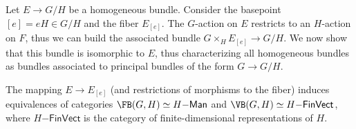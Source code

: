 Let $E\to G\slash H$ be a homogeneous bundle. Consider the basepoint $[e]=eH\in G\slash H$ and the fiber $E_{[e]}$. The $G$-action on $E$ restricts to an $H$-action on $F$, thus we can build the associated bundle $G\times_H E_{[e]}\to G\slash H$. We now show that this bundle is isomorphic to $E$, thus characterizing all homogeneous bundles as bundles associated to principal bundles of the form $G\to G\slash H$.

\begin{thm}\label{prop 1.4.3 Cap}
    The mapping $E\to E_{[e]}$ (and restrictions of morphisms to the fiber) induces equivalences of categories $\FB(G,H)\simeq H\mathsf{-Man}$ and $\VB(G,H)\simeq H\mathsf{-FinVect}$, where $H\mathsf{-FinVect}$ is the category of finite-dimensional representations of $H$.
\end{thm}
